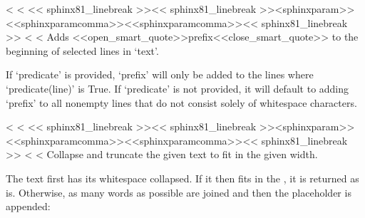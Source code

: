 \documentclass[letterpaper,10pt,english]{sphinxmanual}
\begin{document}
\begin{savenotes}
\begin{savenotes}
\begin{savenotes}
\begin{savenotes}
\begin{fulllineitems}
\end{fulllineitems}


\begin{fulllineitems}
\label{\detokenize{index:textwrap.indent}}
<%
\pysigstartsignatures
<%
\pysiglinewithargsret<< sphinx81_linebreak >>{}<< sphinx81_linebreak >>{\<<sphinxparam>>{}<<sphinxparamcomma>>{}<<sphinxparamcomma>>{}}<< sphinx81_linebreak >>{}
<%
<%
Adds <<open_smart_quote>>prefix<<close_smart_quote>> to the beginning of selected lines in ‘text’.

If ‘predicate’ is provided, ‘prefix’ will only be added to the lines
where ‘predicate(line)’ is True. If ‘predicate’ is not provided,
it will default to adding ‘prefix’ to all non\sphinxhyphen{}empty lines that do not
consist solely of whitespace characters.

\end{fulllineitems}


\begin{fulllineitems}
\label{\detokenize{index:textwrap.shorten}}
<%
\pysigstartsignatures
<%
\pysiglinewithargsret<< sphinx81_linebreak >>{}<< sphinx81_linebreak >>{\<<sphinxparam>>{}<<sphinxparamcomma>>{}<<sphinxparamcomma>>{}}<< sphinx81_linebreak >>{}
<%
<%
Collapse and truncate the given text to fit in the given width.

The text first has its whitespace collapsed.  If it then fits in
the , it is returned as is.  Otherwise, as many words
as possible are joined and then the placeholder is appended:


\end{fulllineitems}
\end{savenotes}
\end{savenotes}
\end{savenotes}
\end{savenotes}
\end{document}
